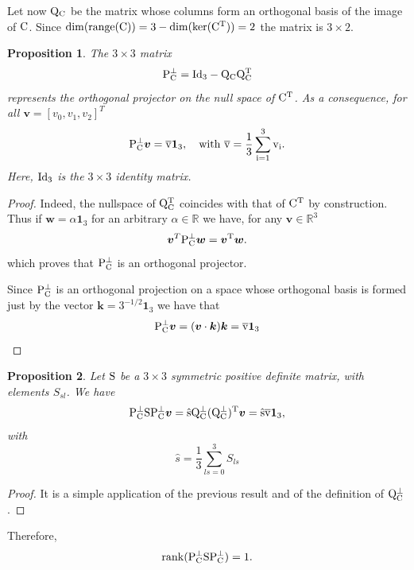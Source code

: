 \documentclass[11pt,a4paper,twoside]{article}
\newcommand{\C}{\ensuremath{\rm C}}
\newcommand{\QC}{\ensuremath{\rm Q}_C^{\perp}}
\newcommand{\QCC}{\ensuremath{\rm Q}_C}
\newcommand{\PC}{\ensuremath{\rm P}_C^{\perp}}
\newtheorem{prop}{Proposition}
\begin{document}
Let now $\QCC$ be the matrix whose columns form an orthogonal basis of
the image of $\C$. Since
$\operatorname{dim}(\operatorname{range}(\C))=3-
\operatorname{dim}(\operatorname{ker}(\C^T))=2$ the matrix is $3\times 2$.


\begin{prop}
The $3\times 3$ matrix 
\begin{equation}
\PC={\rm Id}_3 -\QCC\QCC^T
\end{equation}
represents the orthogonal projector on the null space of $\C^T$. As a consequence, for all $\boldsymbol{v}=[v_0,v_1,v_2]^T$
\begin{equation}
\label{eq:project}
\PC\boldsymbol{v}=\overline{v}\boldsymbol{1}_3,\quad \text{with }
\overline{v}=\dfrac{1}{3}\sum_{i=1}^{3}v_i.
\end{equation}
Here, ${\rm Id}_3$ is the $3\times 3$ identity matrix.
\end{prop}
\begin{proof}
  Indeed, the nullspace of $\QCC^T$ coincides with that of $\C^T$ by
  construction. Thus if $\boldsymbol{w}=\alpha\boldsymbol{1}_3$ for an
  arbitrary $\alpha\in\mathbb{R}$ we have, for any
  $\boldsymbol{v}\in\mathbb{R}^3$
\[
\boldsymbol{v}^T\PC\boldsymbol{w}=\boldsymbol{v}^T\boldsymbol{w}.
\]
which proves that $\PC$ is an orthogonal projector.

Since $\PC$ is an orthogonal projection on a space whose orthogonal basis
is formed just by the vector $\boldsymbol{k}=3^{-1/2}\boldsymbol{1}_3$ we have that
\begin{equation}
\label{eq:pc1}
\PC\boldsymbol{v}=(\boldsymbol{v}\cdot\boldsymbol{k})\boldsymbol{k}
=\overline{v}\boldsymbol{1}_3
\end{equation}
\end{proof}
\begin{prop}
Let ${\rm S}$ be a $3\times 3$ symmetric positive definite matrix, with elements $S_{sl}$. We have
\begin{equation}
\label{eq:pc2}
\PC {\rm S}\PC\boldsymbol{v}=\hat{s}\QC(\QC)^T\boldsymbol{v}=
\hat{s}\overline{v}\boldsymbol{1}_3,
\end{equation}
with 
\begin{equation}
\label{eq:shat}
\hat{s}=\dfrac{1}{3}\sum_{ls=0}^3S_{ls}
\end{equation}
\end{prop}
\begin{proof}
It is a simple application of the previous result and of the definition of $\QC$. 
\end{proof}
Therefore,
\[
\operatorname{rank}(\PC{\rm S}\PC)=1.
\]
\end{document}
